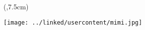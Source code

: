 \begin{textblock*}{\textwidth}(\border,7.5cm)
\begin{center}
\noindent
\texttt{[image: ../linked/usercontent/mimi.jpg]} \\
\end{center}
\end{textblock*}

\vspace*{17.5cm}
